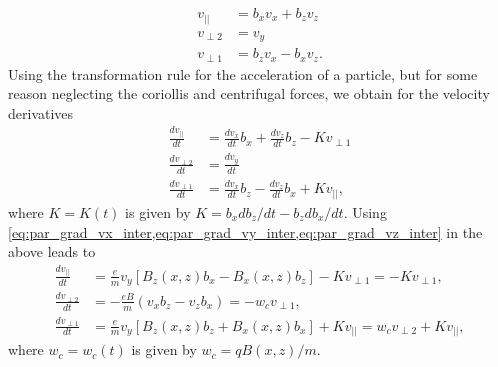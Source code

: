 \documentclass[oneside,a4paper,11pt]{report}
\begin{document}
\begin{align}
    v_{||} &= b_x v_x + b_z v_z \label{eq:par_grad_vel_trans_1}\\
    v_{\perp2} &= v_y \label{eq:par_grad_vel_trans_2}\\
    v_{\perp1} &= b_z v_x - b_x v_z. \label{eq:par_grad_vel_trans_3}
\end{align}
Using the transformation rule for the acceleration of a particle, but for some reason neglecting the coriollis and centrifugal forces, we obtain for the velocity derivatives
\begin{align}
    \frac{dv_{||}}{dt} &= \frac{dv_x}{dt} b_x + \frac{dv_z}{dt} b_z  - K v_{\perp1} \\
    \frac{dv_{\perp2}}{dt} &= \frac{dv_y}{dt}\\
    \frac{dv_{\perp1}}{dt} &= \frac{dv_x}{dt} b_z - \frac{dv_z}{dt} b_x + K v_{||},
\end{align}
where $K = K(t)$ is given by $K = b_x db_z/dt - b_z db_x/dt$. Using \cref{eq:par_grad_vx_inter,eq:par_grad_vy_inter,eq:par_grad_vz_inter} in the above leads to
\begin{align}
    \frac{d v_{||}}{dt} &= \frac{e}{m} v_y [B_z(x,z) b_x - B_x(x,z) b_z] - Kv_{\perp1} = -Kv_{\perp1}, \label{eq:par_grad_vpar_inter} \\
    \frac{dv_{\perp2}}{dt} &= -\frac{eB}{m} (v_x b_z - v_z b_x) = -w_c v_{\perp1}, \label{eq:par_grad_v2_inter} \\
    \frac{dv_{\perp1}}{dt} &= \frac{e}{m} v_y [B_z(x,z) b_z + B_x(x,z) b_x] + Kv_{||} = w_c v_{\perp2} + K v_{||}, \label{eq:par_grad_v1_inter}
\end{align}
where $w_c = w_c(t)$ is given by $w_c = q B(x,z) / m$.
\end{document}
